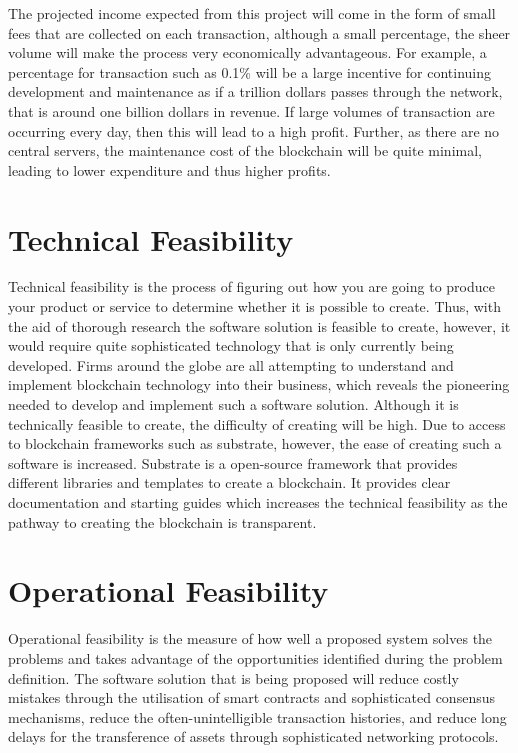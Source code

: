 The projected income expected from this project will come in the form of small fees that are collected on each transaction, although a small percentage, the sheer volume will make the process very economically advantageous. For example, a percentage for transaction such as 0.1\% will be a large incentive for continuing development and maintenance as if a trillion dollars passes through the network, that is around one billion dollars in revenue. If large volumes of transaction are occurring every day, then this will lead to a high profit. Further, as there are no central servers, the maintenance cost of the blockchain will be quite minimal, leading to lower expenditure and thus higher profits.

\section{Technical Feasibility}

Technical feasibility is the process of figuring out how you are going to produce your product or service to determine whether it is possible to create. Thus, with the aid of thorough research the software solution is feasible to create, however, it would require quite sophisticated technology that is only currently being developed. Firms around the globe are all attempting to understand and implement blockchain technology into their business, which reveals the pioneering needed to develop and implement such a software solution. Although it is technically feasible to create, the difficulty of creating will be high. Due to access to blockchain frameworks such as substrate, however, the ease of creating such a software is increased. Substrate is a open-source framework that provides different libraries and templates to create a blockchain. It provides clear documentation and starting guides which increases the technical feasibility as the pathway to creating the blockchain is transparent.

\section{Operational Feasibility}

Operational feasibility is the measure of how well a proposed system solves the problems and takes advantage of the opportunities identified during the problem definition. The software solution that is being proposed will reduce costly mistakes through the utilisation of smart contracts and sophisticated consensus mechanisms, reduce the often-unintelligible transaction histories, and reduce long delays for the transference of assets through sophisticated networking protocols. \\

